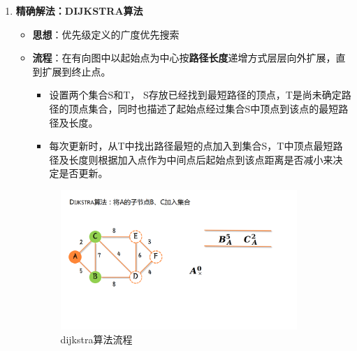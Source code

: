 \documentclass[../main.tex]{subfiles}
\begin{document}
\begin{enumerate}
    \item \textbf{精确解法：DIJKSTRA算法}\label{subsubsec:Dijkstra}
        \begin{itemize}
            \item \textbf{思想}：优先级定义的广度优先搜索
            \item \textbf{流程}：在有向图中以起始点为中心按\textbf{路径长度}递增方式层层向外扩展，直到扩展到终止点。
                \begin{itemize}
                    \item {\small\kaishu 设置两个集合S和T， S存放已经找到最短路径的顶点，T是尚未确定路径的顶点集合，同时也描述了起始点经过集合S中顶点到该点的最短路径及长度。}
                    \item {\small\kaishu 每次更新时，从T中找出路径最短的点加入到集合S，T中顶点最短路径及长度则根据加入点作为中间点后起始点到该点距离是否减小来决定是否更新。}
                \end{itemize}
                \begin{figure}[H]
                    \centering
                    \includegraphics[width=0.9\textwidth]{images/DIJKSTRA/1.png}
                    \caption{dijkstra算法流程}
                \end{figure}
        \end{itemize}
    

\end{enumerate}
\end{document}
